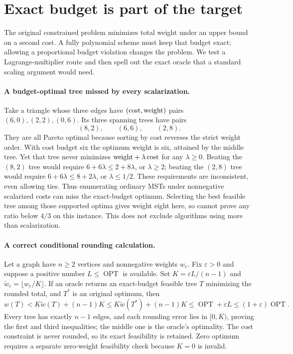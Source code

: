 \documentclass[11pt]{article}
\begin{document}
\section{Exact budget is part of the target}
The original constrained problem minimizes total weight under an
upper bound on a second cost. A fully polynomial scheme must keep
that budget exact; allowing a proportional budget violation changes
the problem. We test a Lagrange-multiplier route and then spell out
the exact oracle that a standard scaling argument would need.

\paragraph{A budget-optimal tree missed by every scalarization.}
Take a triangle whose three edges have $(\hbox{cost},\hbox{weight})$
pairs $(6,0),(2,2),(0,6)$. Its three spanning trees have pairs
\[
(8,2),\qquad(6,6),\qquad(2,8).
\]
They are all Pareto optimal because sorting by cost reverses the
strict weight order. With cost budget six the optimum weight is
six, attained by the middle tree. Yet that tree never minimizes
$\hbox{weight}+\lambda\,\hbox{cost}$ for any $\lambda\ge0$.
Beating the $(8,2)$ tree would require $6+6\lambda\le2+8\lambda$,
or $\lambda\ge2$; beating the $(2,8)$ tree would require
$6+6\lambda\le8+2\lambda$, or $\lambda\le1/2$.
These requirements are inconsistent, even allowing ties.
Thus enumerating ordinary MSTs under nonnegative scalarized costs
can miss the exact-budget optimum. Selecting the best feasible tree
among those supported optima gives weight eight here, so cannot
prove any ratio below $4/3$ on this instance. This does not
exclude algorithms using more than scalarization.

\paragraph{A correct conditional rounding calculation.}
Let a graph have $n\ge2$ vertices and nonnegative weights $w_e$.
Fix $\varepsilon>0$ and suppose a positive number
$L\le\operatorname{OPT}$ is available.
Set $K=\varepsilon L/(n-1)$ and
$\widetilde w_e=\lfloor w_e/K\rfloor$. If an oracle returns
an exact-budget feasible tree $T$ minimizing the rounded total,
and $T^*$ is an original optimum, then
\[
w(T)<K\widetilde w(T)+(n-1)K
\le K\widetilde w(T^*)+(n-1)K
\le\operatorname{OPT}+\varepsilon L
\le(1+\varepsilon)\operatorname{OPT}.
\]
Every tree has exactly $n-1$ edges, and each rounding error lies
in $[0,K)$, proving the first and third inequalities; the middle
one is the oracle's optimality. The cost constraint is never rounded,
so its exact feasibility is retained. Zero optimum requires a separate
zero-weight feasibility check because $K=0$ is invalid.
\end{document}
